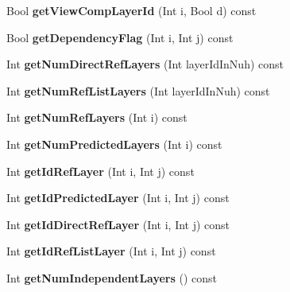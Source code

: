 \begin{DoxyCompactItemize}
Bool {\bfseries get\+View\+Comp\+Layer\+Id} (Int i, Bool d) const
\item 
\mbox{\label{class_t_com_v_p_s_abb0ff271192c3d90bd4a42d0c99fdbef}} 
Bool {\bfseries get\+Dependency\+Flag} (Int i, Int j) const
\item 
\mbox{\label{class_t_com_v_p_s_a26621a59686f3831f16d0cc9cc7b7d35}} 
Int {\bfseries get\+Num\+Direct\+Ref\+Layers} (Int layer\+Id\+In\+Nuh) const
\item 
\mbox{\label{class_t_com_v_p_s_abcfe2b9b7ab91c75a51ada3983f80db0}} 
Int {\bfseries get\+Num\+Ref\+List\+Layers} (Int layer\+Id\+In\+Nuh) const
\item 
\mbox{\label{class_t_com_v_p_s_ad7680f9908143c5dab3fcdd643f67035}} 
Int {\bfseries get\+Num\+Ref\+Layers} (Int i) const
\item 
\mbox{\label{class_t_com_v_p_s_ae967d9cc815c7186c6840a6823b829c9}} 
Int {\bfseries get\+Num\+Predicted\+Layers} (Int i) const
\item 
\mbox{\label{class_t_com_v_p_s_ae93a2bbfd820c6209dd71a94557dacc5}} 
Int {\bfseries get\+Id\+Ref\+Layer} (Int i, Int j) const
\item 
\mbox{\label{class_t_com_v_p_s_abbc7c60f312c982340915a4cdcda7086}} 
Int {\bfseries get\+Id\+Predicted\+Layer} (Int i, Int j) const
\item 
\mbox{\label{class_t_com_v_p_s_a79ccbbb730105cd6f30fa1fae9e9f3a9}} 
Int {\bfseries get\+Id\+Direct\+Ref\+Layer} (Int i, Int j) const
\item 
\mbox{\label{class_t_com_v_p_s_aa01c8f37c5f1d149d56bda18f598c300}} 
Int {\bfseries get\+Id\+Ref\+List\+Layer} (Int i, Int j) const
\item 
\mbox{\label{class_t_com_v_p_s_ac1775522ad07e7b5c38edbd1e99b7c8d}} 
Int {\bfseries get\+Num\+Independent\+Layers} () const
\item 
\mbox{\label{class_t_com_v_p_s_a43d2801e0f09b01207b3b0bcfe5ef899}} 

\end{DoxyCompactItemize}
